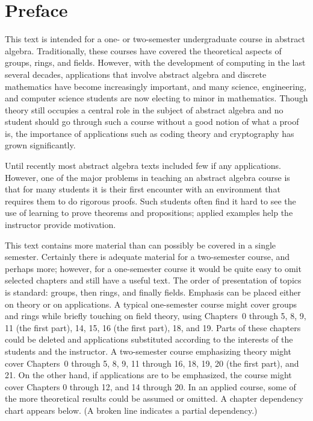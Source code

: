 \chapter*{Preface}
 
 
\pagestyle{myheadings}
 
 
 
 
This text is intended for a one- or two-semester undergraduate course
in  abstract algebra. Traditionally, these courses have covered the
theoretical aspects of groups, rings, and fields.  However, with the
development of computing in the last several decades, applications
that involve abstract algebra and discrete mathematics have become
increasingly important, and many science, engineering, and computer 
science students are now electing to minor in mathematics. Though
theory still occupies a central role in the subject of abstract
algebra and no student should go through such a course without a good
notion of what a proof is, the importance of applications such as
coding theory and cryptography has grown significantly.


Until recently most abstract algebra texts included few if any
applications. However, one of the major problems in teaching an
abstract algebra course is that for many students it is their first
encounter with an environment that requires them to do rigorous
proofs. Such students often find it hard to see the use of learning to
prove theorems and propositions; applied examples help the instructor
provide motivation. 
 
 

This text contains more material than can
possibly be covered in a single semester.  Certainly there is adequate
material for a two-semester course, and perhaps more; however, for a
one-semester course it would be quite easy to omit selected chapters
and still have a useful text.  The order of presentation of topics is
standard: groups, then rings, and finally fields. Emphasis can be
placed either on theory or on applications. A typical one-semester
course might cover groups and rings while briefly touching on field
theory, using Chapters~0 through 5, 8, 9, 11 (the first part), 14, 15,
16 (the first part), 18, and 19. Parts of these chapters could be
deleted and applications substituted according to the interests of the
students and the instructor. A two-semester course emphasizing theory
might cover Chapters~0 through 5, 8, 9, 11 through 16, 18, 19, 20 (the
first part), and 21. On the other hand, if applications are to be
emphasized, the course might cover Chapters 0 through 12, and 14
through 20. In an applied course, some of the more theoretical results
could be assumed or omitted. A chapter dependency chart appears below.
(A broken line indicates a partial dependency.)  



